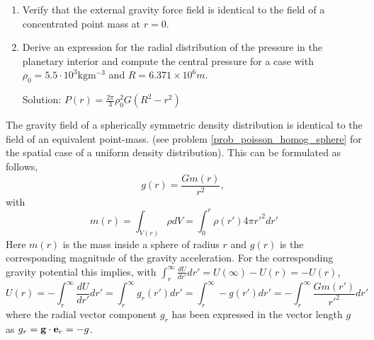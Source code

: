 {\begin{minipage}{0.9\textwidth}
\begin{problem}
{\begin{enumerate}
    \begin{equation}
       g_{ext} = \frac{GM}{r^2} ~,~~~
       U_{ext} =   -\frac{GM}{r}
       \label{grav_field_unif_sphere}
    \end{equation}
\item
    Verify that the external gravity force field is identical to the field of a
    concentrated point mass at $r=0$.
\item
    Derive an expression for the radial distribution of the pressure in the planetary
    interior and compute the central pressure for a case with 
    $\rho_0 = 5.5 \cdot 10^3 \mathrm{kg m^{-3}}$ and
    $R = 6.371 \times 10^6 m$.

    Solution: $P(r) = \frac{2\pi}{3} \rho_0^2 G \left ( R^2 - r^2 \right )$

\end{enumerate}
}
\end{problem}
\end{minipage}
}

\vspace{0.5cm}

The gravity field of a spherically symmetric density
distribution is identical
to the field of an equivalent point-mass.
(see problem \ref{prob_poisson_homog_sphere}  for the spatial case of a uniform density distribution).
This can be formulated as follows,
\begin{equation}
  g(r) =   \frac{Gm(r)}{r^2},~
\label{def_equiv_mass1}
\end{equation}
with 
\begin{equation}
  m(r) =   \int_{V(r)} \rho dV = 
           \int_0^r \rho(r') 4\pi r'^2 dr'
\label{def_equiv_mass2}
\end{equation}
Here $m(r)$ is the mass inside a sphere of radius $r$ and $g(r)$ is 
the corresponding magnitude of the gravity acceleration.
For the corresponding gravity potential this implies, with
$
\int_r^{\infty} \frac{dU}{dr'} dr' = U(\infty) - U(r) = - U(r)
$,
\begin{equation}
 U(r) = - \int_r^{\infty} \frac{dU}{dr'} dr'
      = \int_r^{\infty} g_r(r') dr'
      = \int_r^{\infty} - g(r') dr'
      = - \int_r^{\infty} \frac{Gm(r')}{r'^2} dr'
\label{equiv_potential}
\end{equation}
where the radial vector component $g_r$ has been expressed in the vector length 
$g$ as $g_r= {\bf g} \cdot {\bf e}_r= - g$.

